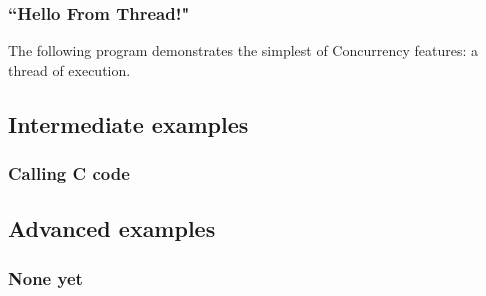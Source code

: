 \documentclass[a4paper,11pt]{article}
\begin{document}
    \subsubsection{``Hello From Thread!"}

The following program demonstrates the simplest of Concurrency features: a thread of execution.

  \subsection{Intermediate examples}
    \subsubsection{Calling C code}

  \subsection{Advanced examples}
    \subsubsection{None yet}
\end{document}
